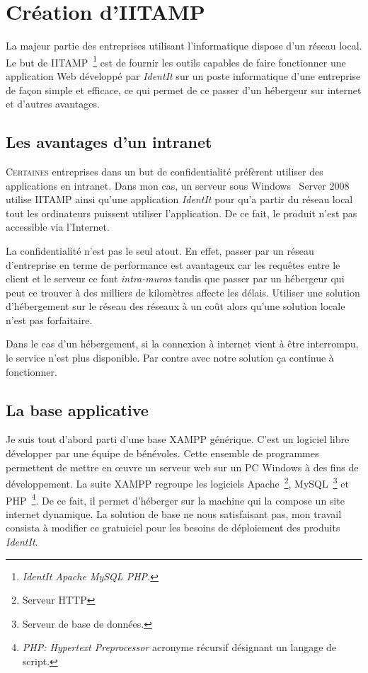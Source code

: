 \chapter{Création d'IITAMP} %
\label{cha:Création d'IITAMP}

\begin{it}
  La majeur partie des entreprises utilisant l'informatique
  dispose d'un réseau local. Le but de IITAMP\, \footnote{\emph{IdentIt
  Apache MySQL PHP.}} est de fournir les outils capables de faire
  fonctionner une application Web développé par \emph{IdentIt} sur un
  poste informatique d'une entreprise de façon simple et efficace, ce
  qui permet de ce passer d'un hébergeur sur internet et d'autres
  avantages.
\end{it}

\section{Les avantages d'un intranet} %
\label{sec:Les avantages d'un intranet}

\lettrine{C}{ertaines} entreprises dans un but de confidentialité
préfèrent utiliser des applications en intranet. Dans mon cas, un
serveur sous Windows~\textregistered{} Server 2008 utilise IITAMP ainsi
qu'une application \emph{IdentIt} pour qu'a partir du réseau local tout
les ordinateurs puissent utiliser l'application. De ce fait, le produit
n'est pas accessible via l'Internet.

La confidentialité n'est pas le seul atout. En effet, passer par un
réseau d'entreprise en terme de performance est avantageux car les
requêtes entre le client et le serveur ce font \emph{intra-muros} tandis
que passer par un hébergeur qui peut ce trouver à des milliers de
kilomètres affecte les délais. Utiliser une solution d'hébergement sur
le réseau des réseaux à un coût alors qu'une solution locale n'est pas
forfaitaire.

Dans le cas d'un hébergement, si la connexion à internet vient à être
interrompu, le service n'est plus disponible. Par contre avec notre
solution ça continue à fonctionner.

\section{La base applicative} %
\label{sec:La base applicative}

Je suis tout d'abord parti d'une base XAMPP générique. C'est un logiciel
libre développer par une équipe de bénévoles. Cette ensemble de
programmes permettent de mettre en \oe{}uvre un serveur web sur un PC
Windows à des fins de développement. La suite XAMPP regroupe les
logiciels Apache\, \footnote{Serveur HTTP}, MySQL\, \footnote{Serveur de
base de données.} et PHP\, \footnote{\emph{PHP: Hypertext Preprocessor}
acronyme récursif désignant un langage de script.}. De ce fait, il
permet d'héberger sur la machine qui la compose un site internet
dynamique. La solution de base ne nous satisfaisant pas, mon travail
consista à modifier ce gratuiciel pour les besoins de déploiement des
produits \emph{IdentIt}.

